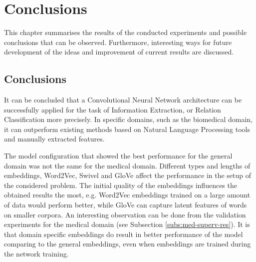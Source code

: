 \chapter{Conclusions} 
\label{chapter:conclusion}
This chapter summarises the results of the conducted experiments and possible 
conclusions that can be observed. Furthermore, interesting ways for future development of the 
ideas and improvement of current results are discussed.

\section{Conclusions}
It can be concluded that a Convolutional Neural Network architecture can be successfully applied for the task of Information 
Extraction, or Relation Classification more precisely. In specific domains, such as the biomedical domain, 
it can outperform existing methods based on Natural Language Processing tools and manually extracted 
features.

The model configuration that showed the best performance for the general domain was 
not the same for the medical domain. Different types and lengths of embeddings, Word2Vec, 
Swivel and GloVe affect the performance in the setup of the considered problem.
The initial quality of the embeddings influences the obtained results the most, e.g. Word2Vec embeddings trained on 
a large amount of data would perform better, while GloVe can capture latent features of words on smaller corpora.
An interesting observation can be done from the validation experiments for the medical domain (see Subsection \ref{subs:med-superv-res}). 
It is that domain specific embeddings do result in better performance of the model comparing to 
the general embeddings, even when embeddings are trained during the network training.

